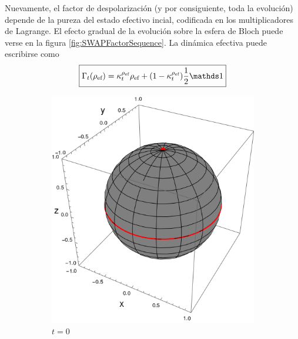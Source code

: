 Nuevamente, el factor de despolarización (y por consiguiente, toda la evolución) depende de la pureza del estado efectivo incial, codificada en los multiplicadores de Lagrange. El efecto gradual de la evolución sobre la esfera de Bloch puede verse en la figura \ref{fig:SWAPFactorSequence}. La dinámica efectiva puede escribirse como
\begin{equation}\label{eq:EffectiveSWAPt}
  \boxed{\Gamma_{t}(\rho_{\ef})=\kappa_{t}^{\rho_{\ef}}\rho_{\ef}+(1-\kappa_{t}^{\rho_{\ef}})\frac{1}{2}\Id}
\end{equation}

\begin{figure}[ht!]
  \centering
  \begin{subfigure}{0.32\textwidth}
    \centering
    \includegraphics[width=0.9\linewidth]{chapter3/figures_toy/sphere_swapcontraction_t=0.0_z=0.9_p=0.9.png}
    \caption{$t=0$}
  \end{subfigure}%
  \begin{subfigure}{0.32\textwidth}
    \centering

\end{subfigure}
\end{figure}
